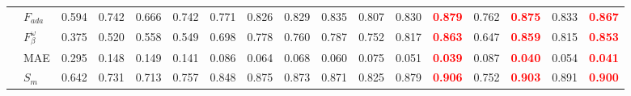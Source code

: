 \documentclass[runningheads]{llncs}
\begin{document}
\begin{table}[t]
{\begin{tabular}{@{}rl|ccccccccccc|cc|cc@{}}
    & $F_{ada}$            & 0.594                                     & 0.742                                       & 0.666                                       & 0.742                                  & 0.771                                      & 0.826                                          & 0.829                                      & 0.835                                        & 0.807                                            & 0.830                                      & \textcolor{red}{\textbf{0.879}} & 0.762                                          & \textcolor{red}{\textbf{0.875}} & 0.833                                     & \textcolor{red}{\textbf{0.867}} \\
    & $F_{\beta}^{\omega}$ & 0.375                                     & 0.520                                       & 0.558                                       & 0.549                                  & 0.698                                      & 0.778                                          & 0.760                                      & 0.787                                        & 0.752                                            & 0.817                                      & \textcolor{red}{\textbf{0.863}} & 0.647                                          & \textcolor{red}{\textbf{0.859}} & 0.815                                     & \textcolor{red}{\textbf{0.853}} \\
    & MAE                  & 0.295                                     & 0.148                                       & 0.149                                       & 0.141                                  & 0.086                                      & 0.064                                          & 0.068                                      & 0.060                                        & 0.075                                            & 0.051                                      & \textcolor{red}{\textbf{0.039}} & 0.087                                          & \textcolor{red}{\textbf{0.040}} & 0.054                                     & \textcolor{red}{\textbf{0.041}} \\
    & $S_{m}$              & 0.642                                     & 0.731                                       & 0.713                                       & 0.757                                  & 0.848                                      & 0.875                                          & 0.873                                      & 0.871                                        & 0.825                                            & 0.879                                      & \textcolor{red}{\textbf{0.906}} & 0.752                                          & \textcolor{red}{\textbf{0.903}} & 0.891                                     & \textcolor{red}{\textbf{0.900}} \\

\end{tabular}}
\end{table}
\end{document}
